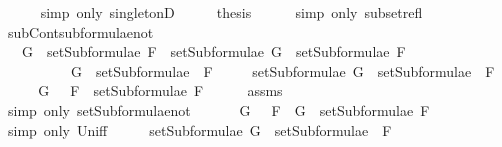 \begin{isabellebody}
\ \ \ \ \isamarkupfalse%
\ {\isacharparenleft}simp\ only{\isacharcolon}\ singletonD{\isacharparenright}\isanewline
\ \ \isamarkupfalse%
\ \isamarkupfalse%
\ {\isacharquery}thesis\isanewline
\ \ \ \ \isamarkupfalse%
\ {\isacharparenleft}simp\ only{\isacharcolon}\ subset{\isacharunderscore}refl{\isacharparenright}\isanewline
{}\isamarkupfalse%
%
\endisatagproof
{\isafoldproof}%
%
\isadelimproof
\isanewline
%
\endisadelimproof
\isanewline
{}\isamarkupfalse%
\ subContsubformulae{\isacharunderscore}not{\isacharcolon}\isanewline
\ \ \ {\isachardoublequoteopen}G\ {\isasymin}\ setSubformulae\ F\ {\isasymLongrightarrow}\ setSubformulae\ G\ {\isasymsubseteq}\ setSubformulae\ F{\isachardoublequoteclose}\isanewline
\ \ \ \ \ \ \ \ \ \ {\isachardoublequoteopen}G\ {\isasymin}\ setSubformulae\ {\isacharparenleft}\isactrlbold {\isasymnot}\ F{\isacharparenright}{\isachardoublequoteclose}\isanewline
\ \ \ \ \ {\isachardoublequoteopen}setSubformulae\ G\ {\isasymsubseteq}\ setSubformulae\ {\isacharparenleft}\isactrlbold {\isasymnot}\ F{\isacharparenright}{\isachardoublequoteclose}\isanewline
%
\isadelimproof
%
\endisadelimproof
%
\isatagproof
{}\isamarkupfalse%
\ {\isacharminus}\isanewline
\ \ \isamarkupfalse%
\ {\isachardoublequoteopen}G\ {\isasymin}\ {\isacharbraceleft}\isactrlbold {\isasymnot}\ F{\isacharbraceright}\ {\isasymunion}\ setSubformulae\ F{\isachardoublequoteclose}\isanewline
\ \ \ \ \isamarkupfalse%
\ assms{\isacharparenleft}{}{\isacharparenright}\isanewline
\ \ \ \ \isamarkupfalse%
\ {\isacharparenleft}simp\ only{\isacharcolon}\ setSubformulae{\isacharunderscore}not{\isacharparenright}\ \isanewline
\ \ \isamarkupfalse%
\ \isamarkupfalse%
\ {\isachardoublequoteopen}G\ {\isasymin}\ {\isacharbraceleft}\isactrlbold {\isasymnot}\ F{\isacharbraceright}\ {\isasymor}\ G\ {\isasymin}\ setSubformulae\ F{\isachardoublequoteclose}\isanewline
\ \ \ \ \isamarkupfalse%
\ {\isacharparenleft}simp\ only{\isacharcolon}\ Un{\isacharunderscore}iff{\isacharparenright}\isanewline
\ \ \isamarkupfalse%
\ \isamarkupfalse%
\ {\isachardoublequoteopen}setSubformulae\ G\ {\isasymsubseteq}\ setSubformulae\ {\isacharparenleft}\isactrlbold {\isasymnot}\ F{\isacharparenright}{\isachardoublequoteclose}\isanewline
\ \ \isamarkupfalse%
\isanewline
\ \ \ \ \isamarkupfalse%

\end{isabellebody}
